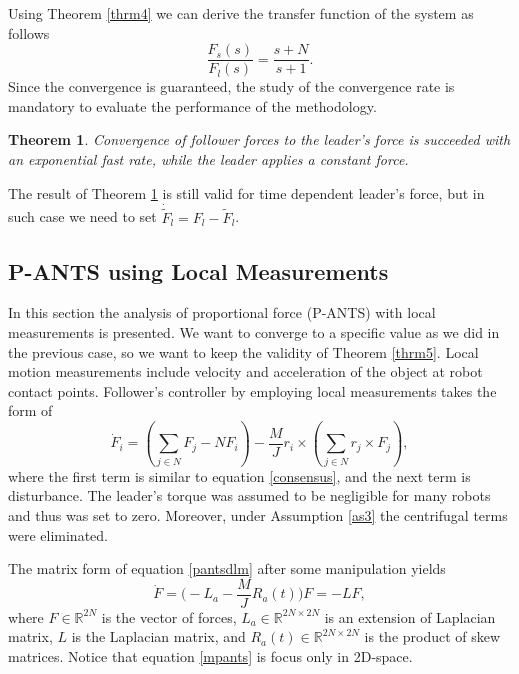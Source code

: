 \documentclass[letterpaper, 10 pt, conference]{ieeeconf}
\newtheorem{theorem}{\textbf{Theorem}}
\begin{document}
Using Theorem \ref{thrm4} we can derive the transfer function of the system as follows
\begin{equation}
\frac{F_s(s)}{F_l(s)}=\frac{s+N}{s+1}.
\end{equation}
Since the convergence is guaranteed, the study of the convergence rate is mandatory to evaluate the performance of the methodology.\vspace{.2cm}
\begin{theorem}\label{thrm6}
\textit{Convergence of follower forces to the leader's force is succeeded with an exponential fast rate, while the leader applies a constant force.} \vspace{.2cm}
\end{theorem}
The result of Theorem \ref{thrm6} is still valid for time dependent leader's force, but in such case we need to set $\dot{\tilde{F}}_l=F_l-\tilde{F}_l$.

\subsection{P-ANTS using Local Measurements}\label{pantslm}
In this section the analysis of proportional force (P-ANTS) with local measurements is presented. We want to converge to a specific value as we did in the previous case, so we want to keep the validity of Theorem \ref{thrm5}. Local motion measurements include velocity and acceleration of the object at robot contact points. Follower's controller by employing local measurements takes the form of
\begin{equation}\label{pantsdlm}
\dot{F}_i=(\sum_{j \in N}F_j-NF_i)-\frac{M}{J}r_i\times (\sum_{j\in N}r_j\times F_j),
\end{equation}
where the first term is similar to equation \ref{consensus}, and the next term is disturbance. The leader's torque was assumed to be negligible for many robots and thus was set to zero. Moreover, under Assumption \ref{as3} the centrifugal terms were eliminated.

The matrix form of equation \ref{pantsdlm} after some manipulation yields
\begin{equation}\label{mpants}
\dot{F}=\Bigg( -L_a-\frac{M}{J}R_a(t) \Bigg)F = -LF,
\end{equation}
where $F \in \mathbb{R}^{2N}$ is the vector of forces,  $L_a  \in \mathbb{R}^{2N\times 2N}$ is an extension of Laplacian matrix, $L$ is the Laplacian matrix, and $R_a(t) \in \mathbb{R}^{2N\times 2N}$ is the product of skew matrices. Notice that equation \ref{mpants} is focus only in 2D-space. 
\end{document}
